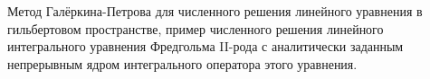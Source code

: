 \documentclass[__main__.tex]{subfiles}
\begin{document}
Метод Галёркина-Петрова для численного решения линейного уравнения в гильбертовом пространстве, пример численного решения линейного интегрального уравнения Фредгольма II-рода с аналитически заданным непрерывным ядром интегрального оператора этого уравнения.
\end{document}
